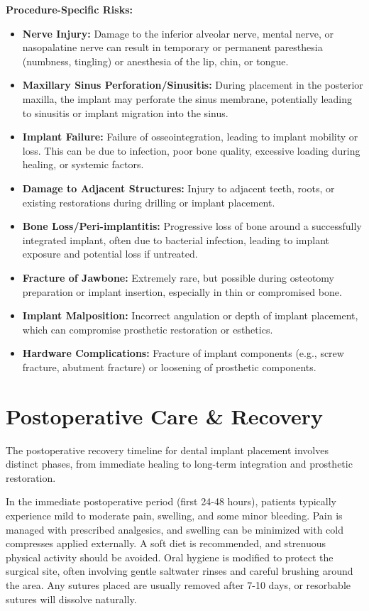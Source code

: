 \textbf{Procedure-Specific Risks:}
\begin{itemize}
  \item \textbf{Nerve Injury:} Damage to the inferior alveolar nerve, mental nerve, or nasopalatine nerve can result in temporary or permanent paresthesia (numbness, tingling) or anesthesia of the lip, chin, or tongue.
  \item \textbf{Maxillary Sinus Perforation/Sinusitis:} During placement in the posterior maxilla, the implant may perforate the sinus membrane, potentially leading to sinusitis or implant migration into the sinus.
  \item \textbf{Implant Failure:} Failure of osseointegration, leading to implant mobility or loss. This can be due to infection, poor bone quality, excessive loading during healing, or systemic factors.
  \item \textbf{Damage to Adjacent Structures:} Injury to adjacent teeth, roots, or existing restorations during drilling or implant placement.
  \item \textbf{Bone Loss/Peri-implantitis:} Progressive loss of bone around a successfully integrated implant, often due to bacterial infection, leading to implant exposure and potential loss if untreated.
  \item \textbf{Fracture of Jawbone:} Extremely rare, but possible during osteotomy preparation or implant insertion, especially in thin or compromised bone.
  \item \textbf{Implant Malposition:} Incorrect angulation or depth of implant placement, which can compromise prosthetic restoration or esthetics.
  \item \textbf{Hardware Complications:} Fracture of implant components (e.g., screw fracture, abutment fracture) or loosening of prosthetic components.
\end{itemize}

\section*{Postoperative Care \& Recovery}
The postoperative recovery timeline for dental implant placement involves distinct phases, from immediate healing to long-term integration and prosthetic restoration.

In the immediate postoperative period (first 24-48 hours), patients typically experience mild to moderate pain, swelling, and some minor bleeding. Pain is managed with prescribed analgesics, and swelling can be minimized with cold compresses applied externally. A soft diet is recommended, and strenuous physical activity should be avoided. Oral hygiene is modified to protect the surgical site, often involving gentle saltwater rinses and careful brushing around the area. Any sutures placed are usually removed after 7-10 days, or resorbable sutures will dissolve naturally.

